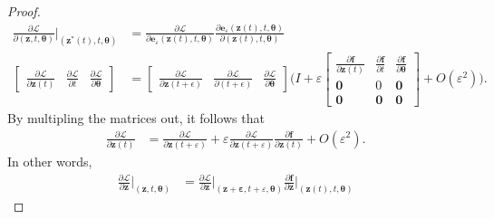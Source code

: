 \documentclass[10pt]{article}
\newcommand{\ve}[1]{\mathbf{#1}}
\newcommand{\ves}[1]{\boldsymbol{#1}}
\newcommand{\mcal}[1]{\mathcal{#1}}
\begin{document}
\begin{itemize}
\begin{proof}
    \begin{align*}
      \frac{\partial \mcal{L}}{\partial (\ve{z}, t, \ves{\theta})}\bigg|_{(\ve{z}^*(t),t,\ves{\theta})}
      &= \frac{\partial \mcal{L}}{\partial \ve{e}_\varepsilon(\ve{z}(t), t, \ves{\theta})} \frac{\partial \ve{e}_\varepsilon (\ve{z}(t), t, \ves{\theta})}{\partial (\ve{z}(t), t, \ves{\theta})} \\
      \begin{bmatrix}
        \frac{\partial \mcal{L}}{\partial \ve{z}(t)} &
        \frac{\partial \mcal{L}}{\partial t} &
        \frac{\partial \mcal{L}}{\partial \ves{\theta}}
      \end{bmatrix}
      &= \begin{bmatrix}
        \frac{\partial \mcal{L}}{\partial \ve{z}(t + \epsilon)} &
        \frac{\partial \mcal{L}}{\partial (t + \epsilon)} &
        \frac{\partial \mcal{L}}{\partial \ves{\theta}}
      \end{bmatrix}
      \bigg( I + \varepsilon \begin{bmatrix}
        \frac{\partial \ve{f}}{\partial\ve{z}(t)}
        & \frac{\partial \ve{f}}{\partial t}
        & \frac{\partial \ve{f}}{\partial \ves{\theta}} \\
        \ve{0} & 0 & \ve{0} \\
        \ve{0} & \ve{0} & \ve{0}
      \end{bmatrix}
      + O(\varepsilon^2) \bigg).
    \end{align*}
    By multipling the matrices out, it follows that
    \begin{align*}
      \frac{\partial \mcal{L}}{\partial \ve{z}(t)}
      &= \frac{\partial \mcal{L}}{\partial \ve{z}(t+\varepsilon)}
      + \varepsilon \frac{\partial \mcal{L}}{\partial \ve{z}(t+\varepsilon)} \frac{\partial \ve{f}}{\partial \ve{z}(t)} + O(\varepsilon^2).
    \end{align*}
    In other words,
    \begin{align*}
      \frac{\partial \mcal{L}}{\partial \ve{z}}\bigg|_{(\ve{z},t,\ves{\theta})}
      &= \frac{\partial \mcal{L}}{\partial \ve{z}}\bigg|_{(\ve{z+\varepsilon},t+\varepsilon,\ves{\theta})}
      \frac{\partial \ve{f}}{\partial \ve{z}}\bigg|_{(\ve{z}(t), t, \ves{\theta})}
    \end{align*}
  \end{proof}  
    
\end{itemize}



  
\end{document}
